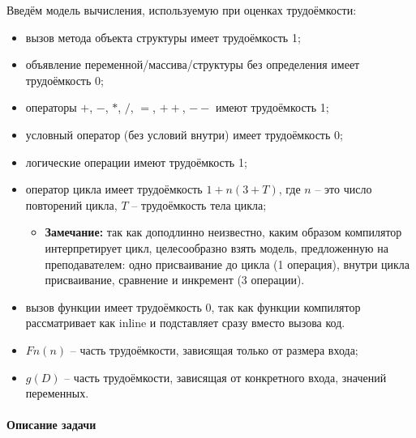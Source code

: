 \documentclass[utf8x, 12pt]{G7-32} %
\begin{document}
Введём модель вычисления, используемую при оценках трудоёмкости:
\begin{itemize}
	\item вызов метода объекта структуры имеет трудоёмкость 1;
	\item объявление переменной/массива/структуры без определения имеет трудоёмкость 0;
	\item операторы $+$, $-$, $*$, $/$, $=$, $++$, $--$ имеют трудоёмкость 1;
	\item условный оператор (без условий внутри) имеет трудоёмкость 0;
	\item логические операции имеют трудоёмкость 1; 
	\item оператор цикла имеет трудоёмкость $1 + n(3 + T)$, где $n$ – это число повторений цикла, $T$ – трудоёмкость тела цикла;
	\begin{itemize}
		\item \textbf{Замечание:} так как доподлинно неизвестно, каким образом компилятор интерпретирует цикл, целесообразно взять модель, предложенную на преподавателем: одно присваивание до цикла (1 операция), внутри цикла присваивание, сравнение и инкремент (3 операции).
	\end{itemize}
	\item вызов функции имеет трудоёмкость 0, так как функции компилятор рассматривает как inline и подставляет сразу вместо вызова код.
	\item $Fn(n)$ – часть трудоёмкости, зависящая только от размера входа;
	\item $g(D)$ – часть трудоёмкости, зависящая от конкретного входа, значений переменных.
\end{itemize}

\newpage

\paragraph{Описание задачи}
\end{document}
